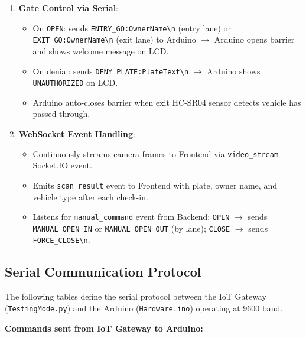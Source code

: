 \documentclass[a4paper]{article}
\begin{document}
\begin{tcolorbox}[colback=white!95!gray, colframe=black, title=IoT Gateway Architecture]
\begin{enumerate}
\begin{itemize}
        \item Backend returns authorization response with \texttt{action} field: \texttt{OPEN} or \texttt{KEEP\_CLOSED}.
        \item Gateway processes response and sends corresponding serial command to Arduino.
    \end{itemize}
    \item \textbf{Gate Control via Serial}:
    \begin{itemize}
        \item On \texttt{OPEN}: sends \texttt{ENTRY\_GO:OwnerName\textbackslash n} (entry lane) or \texttt{EXIT\_GO:OwnerName\textbackslash n} (exit lane) to Arduino $\rightarrow$ Arduino opens barrier and shows welcome message on LCD.
        \item On denial: sends \texttt{DENY\_PLATE:PlateText\textbackslash n} $\rightarrow$ Arduino shows \texttt{UNAUTHORIZED} on LCD.
        \item Arduino auto-closes barrier when exit HC-SR04 sensor detects vehicle has passed through.
    \end{itemize}
    \item \textbf{WebSocket Event Handling}:
    \begin{itemize}
        \item Continuously streams camera frames to Frontend via \texttt{video\_stream} Socket.IO event.
        \item Emits \texttt{scan\_result} event to Frontend with plate, owner name, and vehicle type after each check-in.
        \item Listens for \texttt{manual\_command} event from Backend: \texttt{OPEN} $\rightarrow$ sends \texttt{MANUAL\_OPEN\_IN} or \texttt{MANUAL\_OPEN\_OUT} (by lane); \texttt{CLOSE} $\rightarrow$ sends \texttt{FORCE\_CLOSE\textbackslash n}.
    \end{itemize}
\end{enumerate}
\end{tcolorbox}

\subsection{Serial Communication Protocol}
The following tables define the serial protocol between the IoT Gateway (\texttt{TestingMode.py}) and the Arduino (\texttt{Hardware.ino}) operating at 9600 baud.

\noindent \textbf{Commands sent from IoT Gateway to Arduino:}
\end{document}
